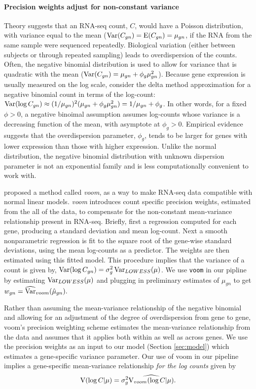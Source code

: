 \paragraph{Precision weights adjust for non-constant variance}
Theory suggests that an RNA-seq count, $C$, would have a Poisson distribution, with variance equal to the mean ($\operatorname{Var}(C_{gn})=\operatorname{E}(C_{gn})=\mu_{gn}$, if the RNA from the same sample were sequenced repeatedly. Biological variation (either between subjects or through repeated sampling) leads to overdispersion of the counts. Often, the negative binomial distribution is used to allow for variance that is quadratic with the mean ($\operatorname{Var}(C_{gn})=\mu_{gn}+\phi_g\mu_{gn}^2$). Because gene expression is usually measured on the log scale, consider the delta method  approximation for a negative binomial count in terms of the log-count: $\operatorname{Var}(\log C_{gn}) \approx (1/\mu_{gn})^2(\mu_{gn} + \phi_g\mu_{gn}^2)=1/\mu_{gn} + \phi_g$. In other words, for a fixed $\phi>0$, a negative binoimal assumption assumes log-counts whose variance is a decreasing function of the mean, with asymptote at $\phi_g>0$. Empirical evidence \citep{voom} suggests that the overdispersion parameter, $\phi_g$, tends to be larger for genes with lower expression than those with higher expression. Unlike the normal distribution, the negative binomial distribution with unknown dispersion parameter is not an exponential family and is less computationally convenient to work with.

\cite{voom} proposed a method called \textit{voom}, as a way to make RNA-seq data compatible with normal linear models. \textit{voom} introduces count specific precision weights, estimated from the all of the data, to compensate for the non-constant mean-variance relationship present in RNA-seq. Briefly, first a regression computed for each gene, producing a standard deviation and mean log-count. Next a smooth nonparametric regression is fit to the square root of the gene-wise standard deviations, using the mean log-counts as a predictor. The weights are then estimated using this fitted model. This procedure implies that the variance of a count is given by, $\operatorname{Var}(\log C_{gn})=\sigma_{g}^2\operatorname{Var}_{LOWESS}(\mu)$. We use \texttt{voom} in our pipline by estimating $\operatorname{Var}_{LOWESS}(\mu)$ and plugging in preliminary estimates of $\mu_{gn}$ to get $w_{gn} = \widehat{\operatorname{Var}}_{voom}(\hat{\mu}_{gn}).$

Rather than assuming the mean-variance relationship of the negative binomial and allowing for an adjustment of the degree of overdispersion from gene to gene, voom's precision weighting scheme estimates the mean-variance relationship from the data and assumes that it applies both within as well as across genes. We use the precision weights as an input to our model (Section \ref{sec:model}) which estimates a gene-specific variance parameter. Our use of voom in our pipeline implies a gene-specific mean-variance relationship \textit{for the log counts} given by
$$\operatorname{V}(\log C|\mu)=\sigma^2_g \widehat{\operatorname{V}_{voom}(\log C|\mu)}.$$

